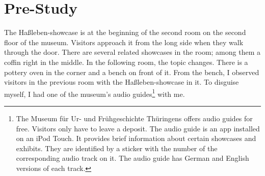 
\section{Pre-Study}
\label{evaluation_pre}

The Haßleben-showcase is at the beginning of the second room on the second floor of the museum. Visitors approach it from the long side when they walk through the door. There are several related showcases in the room; among them a coffin right in the middle. In the following room, the topic changes. There is a pottery oven in the corner and a bench on front of it. From the bench, I observed visitors in the previous room with the Haßleben-showcase in it. To disguise myself, I had one of the museum's audio guides\footnote{The Museum für Ur- und Frühgeschichte Thüringens offers audio guides for free. Visitors only have to leave a deposit. The audio guide is an app installed on an iPod Touch. It provides brief information about certain showcases and exhibits. They are identified by a sticker with the number of the corresponding audio track on it. The audio guide has German and English versions of each track.} with me.  
 
